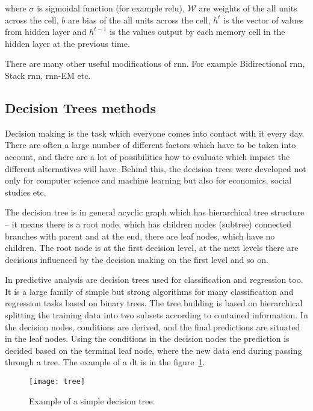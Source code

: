 \documentclass[thesis=M,english]{FITthesis}[2012/10/20]
\begin{document}
\noindent where $\sigma$ is sigmoidal function (for example \gls{relu}), $\mathcal{W}$ are weights of the all units across the cell, $b$ are bias of the all units across the cell, $h^{t}$ is the vector of values from hidden layer and $h^{t-1}$ is the values output by each memory cell in the hidden layer at the previous time.  

There are many other useful modifications of \gls{rnn}. For example Bidirectional \gls{rnn}, Stack \gls{rnn}, \gls{rnn}-EM etc.\cite{Lipton2015rnn} 

\subsection{Decision Trees methods}\label{sec:trees}

Decision making is the task which everyone comes into contact with it every day. There are often a large number of different factors which have to be taken into account, and there are a lot of possibilities how to evaluate which impact the different alternatives will have. Behind this, the decision trees were developed not only for computer science and machine learning but also for economics, social studies etc.

The decision tree is in general acyclic graph which has hierarchical tree structure -- it means there is a root node, which has children nodes (subtree) connected branches with parent and at the end, there are leaf nodes, which have no children. The root node is at the first decision level, at the next levels there are decisions influenced by the decision making on the first level and so on.

In predictive analysis are decision trees used for classification and regression too. It is a large family of simple but strong algorithms for many classification and regression tasks based on binary trees. The tree building is based on hierarchical splitting the training data into two subsets according to contained information. In the decision nodes, conditions are derived, and the final predictions are situated in the leaf nodes. Using the conditions in the decision nodes the prediction is decided based on the terminal leaf node, where the new data end during passing through a tree. The example of a \gls{dt} is in the figure~\ref{fig:dt}.

\begin{figure}[ht]\centering
    \texttt{[image: tree]}
    \caption{Example of a simple decision tree.}\label{fig:dt}
\end{figure}
\end{document}
